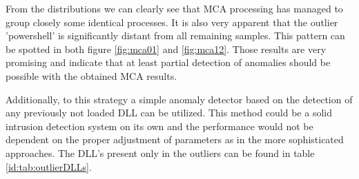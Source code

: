 \documentclass[a4paper,twoside,12pt]{book}
\begin{document}
From the distributions we can clearly see that MCA processing has managed to group closely some
identical processes. It is also very apparent that the outlier 'powershell' is significantly distant from all remaining samples. 
This pattern can be spotted in both figure \ref{fig:mca01} and \ref{fig:mca12}. Those results are very 
promising and indicate that at least partial detection of anomalies should be possible with the obtained MCA results.

Additionally, to this strategy a simple anomaly detector based on the detection of any previously not loaded
DLL can be utilized. This method could be a solid intrusion detection system on its own and the performance
would not be dependent on the proper adjustment of parameters as in the more sophisticated approaches. The 
DLL's present only in the outliers can be found in table \ref{id:tab:outlierDLLs}.
\end{document}
